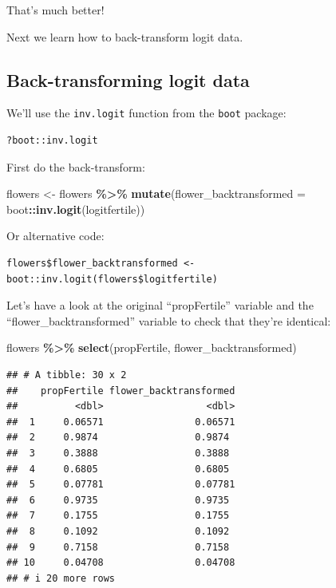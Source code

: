 \documentclass[
]{book}
\newenvironment{Shaded}{\begin{snugshade}}{\end{snugshade}}
\newcommand{\AttributeTok}[1]{\textcolor[rgb]{0.13,0.29,0.53}{#1}}
\newcommand{\FunctionTok}[1]{\textcolor[rgb]{0.13,0.29,0.53}{\textbf{#1}}}
\newcommand{\NormalTok}[1]{#1}
\newcommand{\OtherTok}[1]{\textcolor[rgb]{0.56,0.35,0.01}{#1}}
\newcommand{\SpecialCharTok}[1]{\textcolor[rgb]{0.81,0.36,0.00}{\textbf{#1}}}
\begin{document}
That's much better!

Next we learn how to back-transform logit data.

\subsection{Back-transforming logit data}\label{logit_back}

We'll use the \texttt{inv.logit} function from the \texttt{boot} package:

\begin{verbatim}
?boot::inv.logit
\end{verbatim}

First do the back-transform:

\begin{Shaded}
\begin{Highlighting}[]
\NormalTok{flowers }\OtherTok{\textless{}{-}}\NormalTok{ flowers }\SpecialCharTok{\%\textgreater{}\%}
  \FunctionTok{mutate}\NormalTok{(}\AttributeTok{flower\_backtransformed =}\NormalTok{ boot}\SpecialCharTok{::}\FunctionTok{inv.logit}\NormalTok{(logitfertile))}
\end{Highlighting}
\end{Shaded}

Or alternative code:

\begin{verbatim}
flowers$flower_backtransformed <- boot::inv.logit(flowers$logitfertile)
\end{verbatim}

Let's have a look at the original ``propFertile'' variable and the ``flower\_backtransformed'' variable to check that they're identical:

\begin{Shaded}
\begin{Highlighting}[]
\NormalTok{flowers }\SpecialCharTok{\%\textgreater{}\%}
  \FunctionTok{select}\NormalTok{(propFertile, flower\_backtransformed)}
\end{Highlighting}
\end{Shaded}

\begin{verbatim}
## # A tibble: 30 x 2
##    propFertile flower_backtransformed
##          <dbl>                  <dbl>
##  1     0.06571                0.06571
##  2     0.9874                 0.9874 
##  3     0.3888                 0.3888 
##  4     0.6805                 0.6805 
##  5     0.07781                0.07781
##  6     0.9735                 0.9735 
##  7     0.1755                 0.1755 
##  8     0.1092                 0.1092 
##  9     0.7158                 0.7158 
## 10     0.04708                0.04708
## # i 20 more rows
\end{verbatim}
\end{document}
